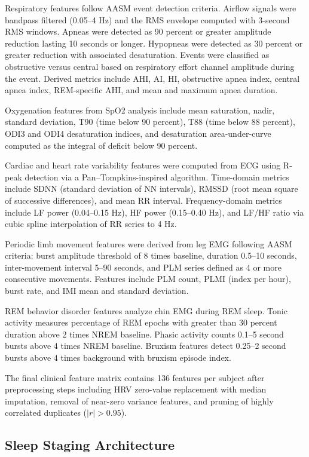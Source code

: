 \documentclass[pdflatex,sn-mathphys-num]{sn-jnl}%
\theoremstyle{thmstyleone}%
\theoremstyle{thmstyletwo}%
\theoremstyle{thmstylethree}%
\begin{document}
Respiratory features follow AASM event detection criteria. Airflow signals were bandpass filtered (0.05--4 Hz) and the RMS envelope computed with 3-second RMS windows. Apneas were detected as 90 percent or greater amplitude reduction lasting 10 seconds or longer. Hypopneas were detected as 30 percent or greater reduction with associated desaturation. Events were classified as obstructive versus central based on respiratory effort channel amplitude during the event. Derived metrics include AHI, AI, HI, obstructive apnea index, central apnea index, REM-specific AHI, and mean and maximum apnea duration.

Oxygenation features from SpO2 analysis include mean saturation, nadir, standard deviation, T90 (time below 90 percent), T88 (time below 88 percent), ODI3 and ODI4 desaturation indices, and desaturation area-under-curve computed as the integral of deficit below 90 percent.

Cardiac and heart rate variability features were computed from ECG using R-peak detection via a Pan--Tompkins-inspired algorithm. Time-domain metrics include SDNN (standard deviation of NN intervals), RMSSD (root mean square of successive differences), and mean RR interval. Frequency-domain metrics include LF power (0.04--0.15 Hz), HF power (0.15--0.40 Hz), and LF/HF ratio via cubic spline interpolation of RR series to 4 Hz.

Periodic limb movement features were derived from leg EMG following AASM criteria: burst amplitude threshold of 8 times baseline, duration 0.5--10 seconds, inter-movement interval 5--90 seconds, and PLM series defined as 4 or more consecutive movements. Features include PLM count, PLMI (index per hour), burst rate, and IMI mean and standard deviation.

REM behavior disorder features analyze chin EMG during REM sleep. Tonic activity measures percentage of REM epochs with greater than 30 percent duration above 2 times NREM baseline. Phasic activity counts 0.1--5 second bursts above 4 times NREM baseline. Bruxism features detect 0.25--2 second bursts above 4 times background with bruxism episode index.

The final clinical feature matrix contains 136 features per subject after preprocessing steps including HRV zero-value replacement with median imputation, removal of near-zero variance features, and pruning of highly correlated duplicates ($|r| > 0.95$).

\subsection{Sleep Staging Architecture}\label{subsec:staging}
\end{document}
